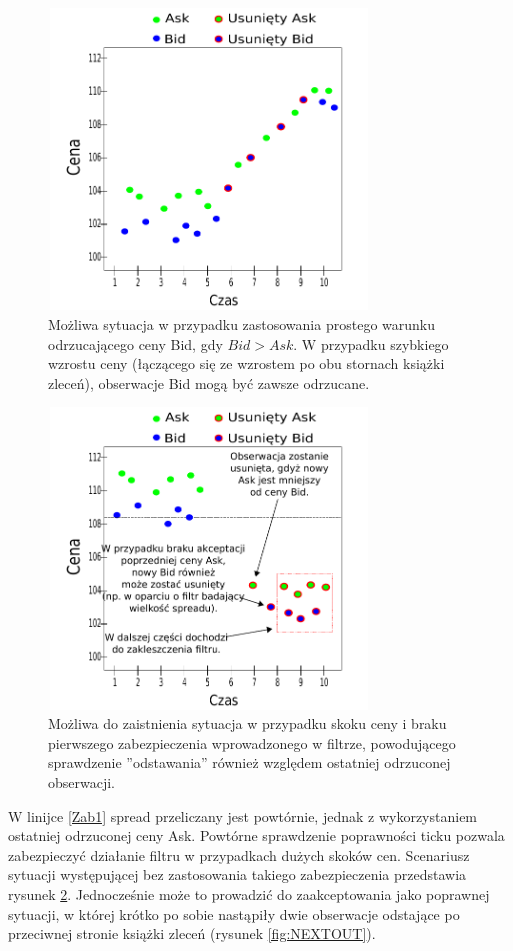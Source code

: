 \documentclass[a4paper,12pt,openany, DIV=calc, headsepline]{scrbook}
\begin{document}
\begin{figure}[h]
  \centering
  \includegraphics[width=85mm, height=80mm]{wykresy/cross}
  \caption{Możliwa sytuacja w przypadku zastosowania prostego warunku odrzucającego ceny Bid, gdy $Bid > Ask$. W przypadku szybkiego wzrostu ceny (łączącego się ze wzrostem po obu stornach książki zleceń), obserwacje Bid mogą być zawsze odrzucane.}
  \label{fig:Cross}
\end{figure}

\begin{figure}[h]
  \centering
  \includegraphics[width=85mm, height=80mm]{wykresy/relacjaBIDASK}
  \caption{Możliwa do zaistnienia sytuacja w przypadku skoku ceny i braku pierwszego zabezpieczenia wprowadzonego w filtrze, powodującego sprawdzenie ''odstawania'' również względem ostatniej odrzuconej obserwacji.}
  \label{fig:JUMP}
\end{figure}


W linijce \ref{Zab1} spread przeliczany jest powtórnie, jednak z wykorzystaniem ostatniej odrzuconej ceny Ask. Powtórne sprawdzenie poprawności ticku pozwala zabezpieczyć działanie filtru w przypadkach dużych skoków cen. Scenariusz sytuacji występującej bez zastosowania takiego zabezpieczenia przedstawia rysunek \ref{fig:JUMP}. Jednocześnie może to prowadzić do zaakceptowania jako poprawnej sytuacji, w której krótko po sobie nastąpiły dwie obserwacje odstające po przeciwnej stronie książki zleceń (rysunek \ref{fig:NEXTOUT}).
\end{document}
